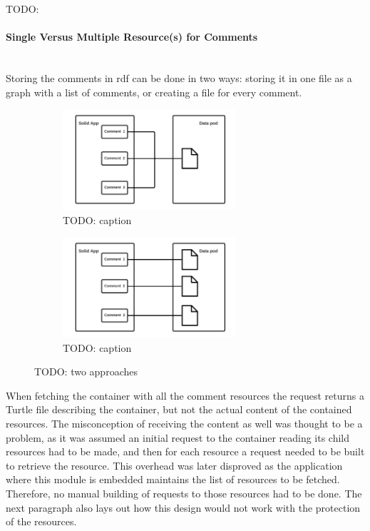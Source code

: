 TODO: 

\vspace{0.5cm}
\paragraph{Single Versus Multiple Resource(s) for Comments}\mbox{}\\
Storing the comments in \gls{rdf} can be done in two ways: storing it in one file as a graph with a list of comments, or creating a file for every comment.

\begin{figure}
    \centering
    \begin{subfigure}{.5\textwidth}
      \centering
      \includegraphics[width=0.7\textwidth]{prototype/graphs/poc-comment-single-resource-comments.png}
      \caption{TODO: caption}
      \label{fig:ppc-comment-single-resource-comments}
    \end{subfigure}%
    \begin{subfigure}{.5\textwidth}
      \centering
      \includegraphics[width=0.7\textwidth]{prototype/graphs/poc-comment-multiple-resources-comments.png}
      \caption{TODO: caption}
      \label{fig:poc-comment-multiple-resources-comments}
    \end{subfigure}
    \caption{TODO: two approaches}
    \label{fig:test}
\end{figure}

When fetching the container with all the comment resources the request returns a Turtle file describing the container, but not the actual content of the contained resources. The misconception of receiving the content as well was thought to be a problem, as it was assumed an initial request to the container reading its child resources had to be made, and then for each resource a request needed to be built to retrieve the resource. This overhead was later disproved as the application where this module is embedded maintains the list of resources to be fetched. Therefore, no manual building of requests to those resources had to be done. The next paragraph also lays out how this design would not work with the protection of the resources.

